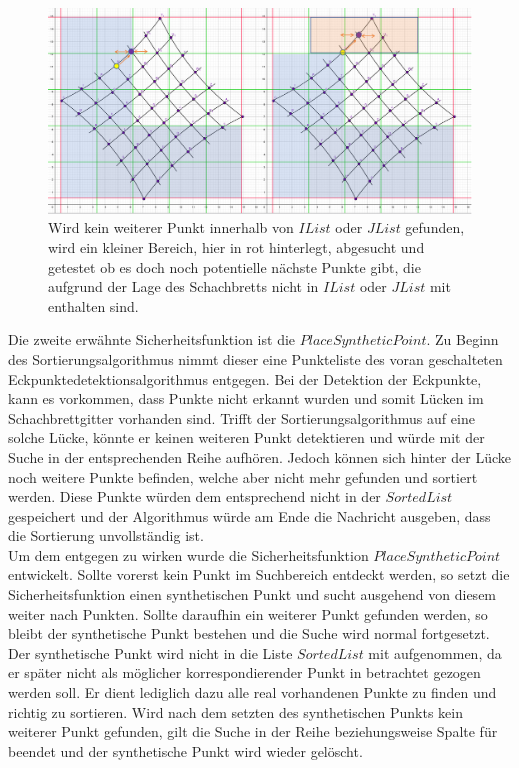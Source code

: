 \begin{figure}[!htb]
	\centering
	\includegraphics[width=0.8\linewidth]{images/VerzeichnetesSchachbrett_6.png}
	\caption[Sicherheitsfunktion $SaftyList$]{Wird kein weiterer Punkt innerhalb von $IList$ oder $JList$ gefunden, wird ein kleiner Bereich, hier in rot hinterlegt, abgesucht und getestet ob es doch noch potentielle nächste Punkte gibt, die aufgrund der Lage des Schachbretts nicht in $IList$ oder $JList$ mit enthalten sind.}
	\label{fig:SaftyList}
\end{figure}


Die zweite erwähnte Sicherheitsfunktion ist die $PlaceSyntheticPoint$. Zu Beginn des Sortierungsalgorithmus nimmt dieser eine Punkteliste des voran geschalteten Eckpunktedetektionsalgorithmus entgegen. Bei der Detektion der Eckpunkte, kann es vorkommen, dass Punkte nicht erkannt wurden und somit Lücken im Schachbrettgitter vorhanden sind. Trifft der Sortierungsalgorithmus auf eine solche Lücke, könnte er keinen weiteren Punkt detektieren und würde mit der Suche in der entsprechenden Reihe aufhören. Jedoch können sich hinter der Lücke noch weitere Punkte befinden, welche aber nicht mehr gefunden und sortiert werden. Diese Punkte würden dem entsprechend nicht in der $SortedList$ gespeichert und der Algorithmus würde am Ende die Nachricht ausgeben, dass die Sortierung unvollständig ist.\\

Um dem entgegen zu wirken wurde die Sicherheitsfunktion $PlaceSyntheticPoint$ entwickelt. Sollte vorerst kein Punkt im Suchbereich entdeckt werden, so setzt die Sicherheitsfunktion einen synthetischen Punkt und sucht ausgehend von diesem weiter nach Punkten. Sollte daraufhin ein weiterer Punkt gefunden werden, so bleibt der synthetische Punkt bestehen und die Suche wird normal fortgesetzt. Der synthetische Punkt wird nicht in die Liste $SortedList$ mit aufgenommen, da er später nicht als möglicher korrespondierender Punkt in betrachtet gezogen werden soll. Er dient lediglich dazu alle real vorhandenen Punkte zu finden und richtig zu sortieren. Wird nach dem setzten des synthetischen Punkts kein weiterer Punkt gefunden, gilt die Suche in der Reihe beziehungsweise Spalte für beendet und der synthetische Punkt wird wieder gelöscht. \\


